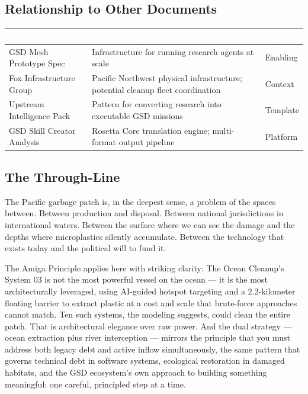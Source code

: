 \documentclass[11pt,letterpaper]{article}
\newcommand{\tableheader}[1]{\textbf{\sffamily\textcolor{white}{#1}}}
\begin{document}
\subsection{Relationship to Other Documents}

\begin{center}
\begin{tabularx}{\textwidth}{L{4cm}XC{2.5cm}}
\toprule
{}
\tableheader{Document} & \tableheader{Relationship} & \tableheader{Type} \\
\midrule
GSD Mesh Prototype Spec & Infrastructure for running research agents at scale & Enabling \\
Fox Infrastructure Group & Pacific Northwest physical infrastructure; potential cleanup fleet coordination & Context \\
Upstream Intelligence Pack & Pattern for converting research into executable GSD missions & Template \\
GSD Skill Creator Analysis & Rosetta Core translation engine; multi-format output pipeline & Platform \\
\bottomrule
\end{tabularx}
\end{center}

\subsection{The Through-Line}

The Pacific garbage patch is, in the deepest sense, a problem of the spaces between. Between production and disposal. Between national jurisdictions in international waters. Between the surface where we can see the damage and the depths where microplastics silently accumulate. Between the technology that exists today and the political will to fund it.

The Amiga Principle applies here with striking clarity: The Ocean Cleanup's System 03 is not the most powerful vessel on the ocean --- it is the most architecturally leveraged, using AI-guided hotspot targeting and a 2.2-kilometer floating barrier to extract plastic at a cost and scale that brute-force approaches cannot match. Ten such systems, the modeling suggests, could clean the entire patch. That is architectural elegance over raw power. And the dual strategy --- ocean extraction plus river interception --- mirrors the principle that you must address both legacy debt and active inflow simultaneously, the same pattern that governs technical debt in software systems, ecological restoration in damaged habitats, and the GSD ecosystem's own approach to building something meaningful: one careful, principled step at a time.
\end{document}
